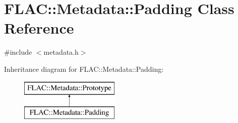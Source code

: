 \hypertarget{class_f_l_a_c_1_1_metadata_1_1_padding}{}\section{F\+L\+AC\+:\+:Metadata\+:\+:Padding Class Reference}
\label{class_f_l_a_c_1_1_metadata_1_1_padding}


{\ttfamily \#include $<$metadata.\+h$>$}

Inheritance diagram for F\+L\+AC\+:\+:Metadata\+:\+:Padding\+:\begin{figure}[H]
\begin{center}
\leavevmode
\includegraphics[height=2.000000cm]{class_f_l_a_c_1_1_metadata_1_1_padding}
\end{center}
\end{figure}
